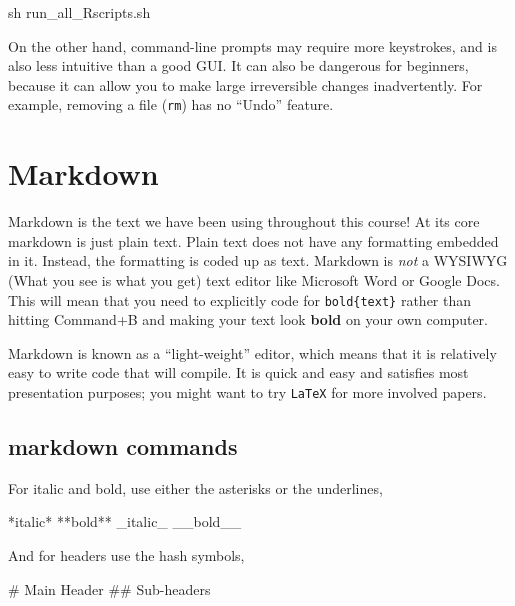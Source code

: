 \documentclass[]{book}
\newenvironment{Shaded}{\begin{snugshade}}{\end{snugshade}}
\newcommand{\FunctionTok}[1]{\textcolor[rgb]{0.00,0.00,0.00}{#1}}
\newcommand{\NormalTok}[1]{#1}
\theoremstyle{definition}
\theoremstyle{definition}
\theoremstyle{definition}
\theoremstyle{remark}
\begin{document}
\begin{Shaded}
\begin{Highlighting}[]
\FunctionTok{sh}\NormalTok{ run_all_Rscripts.sh}
\end{Highlighting}
\end{Shaded}

On the other hand, command-line prompts may require more keystrokes, and
is also less intuitive than a good GUI. It can also be dangerous for
beginners, because it can allow you to make large irreversible changes
inadvertently. For example, removing a file (\texttt{rm}) has no
``Undo'' feature.

\section{Markdown}\label{markdown}

Markdown is the text we have been using throughout this course! At its
core markdown is just plain text. Plain text does not have any
formatting embedded in it. Instead, the formatting is coded up as text.
Markdown is \emph{not} a WYSIWYG (What you see is what you get) text
editor like Microsoft Word or Google Docs. This will mean that you need
to explicitly code for \texttt{bold\{text\}} rather than hitting
Command+B and making your text look \textbf{bold} on your own computer.

Markdown is known as a ``light-weight'' editor, which means that it is
relatively easy to write code that will compile. It is quick and easy
and satisfies most presentation purposes; you might want to try
\texttt{LaTeX} for more involved papers.

\subsection{markdown commands}\label{markdown-commands}

For italic and bold, use either the asterisks or the underlines,

\begin{Shaded}
\begin{Highlighting}[]
\NormalTok{*italic*   **bold**}
\NormalTok{_italic_   __bold__}
\end{Highlighting}
\end{Shaded}

And for headers use the hash symbols,

\begin{Shaded}
\begin{Highlighting}[]
\FunctionTok{# Main Header}
\FunctionTok{## Sub-headers}
\end{Highlighting}
\end{Shaded}
\end{document}
